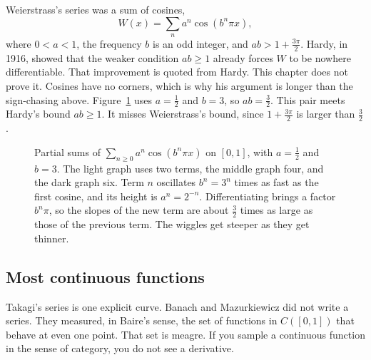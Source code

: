 Weierstrass's series was a sum of cosines,
\[W(x)=\sum_na^n\cos(b^n\pi x),\]
where $0<a<1$, the frequency $b$ is an odd integer, and $ab>1+\frac{3\pi}2$. Hardy, in 1916, showed that the weaker condition $ab\ge1$ already forces $W$ to be nowhere differentiable. That improvement is quoted from Hardy. This chapter does not prove it.
Cosines have no corners, which is why his argument is longer than the sign-chasing above. Figure~\ref{fig:weierstrass} uses $a=\frac12$ and $b=3$, so $ab=\frac32$. This pair meets Hardy's bound $ab\ge1$. It misses Weierstrass's bound, since $1+\frac{3\pi}2$ is larger than $\frac32$.

\begin{figure}[ht]
\centering
{}
\caption{Partial sums of $\sum_{n\ge0}a^n\cos(b^n\pi x)$ on $[0,1]$, with $a=\frac12$ and $b=3$. The light graph uses two terms, the middle graph four, and the dark graph six. Term $n$ oscillates $b^n=3^n$ times as fast as the first cosine, and its height is $a^n=2^{-n}$. Differentiating brings a factor $b^n\pi$, so the slopes of the new term are about $\frac32$ times as large as those of the previous term. The wiggles get steeper as they get thinner.}
\label{fig:weierstrass}
\end{figure}

\subsection*{Most continuous functions}

Takagi's series is one explicit curve. Banach and Mazurkiewicz did not write a series. They measured, in Baire's sense, the set of functions in $C([0,1])$ that behave at even one point. That set is meagre. If you sample a continuous function in the sense of category, you do not see a derivative.

